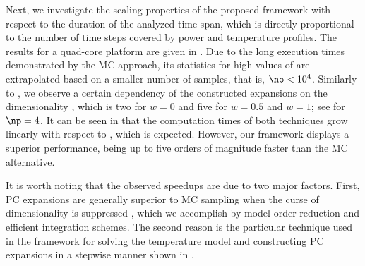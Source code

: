 Next, we investigate the scaling properties of the proposed framework with
respect to the duration of the analyzed time span, which is directly
proportional to the number of time steps \ns covered by power and temperature
profiles. The results for a quad-core platform are given in
. Due to the long execution times demonstrated
by the \ac{MC} approach, its statistics for high values of \ns are extrapolated
based on a smaller number of samples, that is, $\no < 10^4$. Similarly to
, we observe a certain dependency of the
constructed expansions on the dimensionality \nz, which is two for $w = 0$ and
five for $w = 0.5$ and $w = 1$; see  for
$\np = 4$. It can be seen in  that the
computation times of both techniques grow linearly with respect to \ns, which is
expected. However, our framework displays a superior performance, being up to
five orders of magnitude faster than the \ac{MC} alternative.

It is worth noting that the observed speedups are due to two major factors.
First, \ac{PC} expansions are generally superior to \ac{MC} sampling when the
curse of dimensionality is suppressed \cite{eldred2008, xiu2010}, which we
accomplish by model order reduction and efficient integration schemes. The
second reason is the particular technique used in the framework for solving the
temperature model and constructing \ac{PC} expansions in a stepwise manner shown
in .
